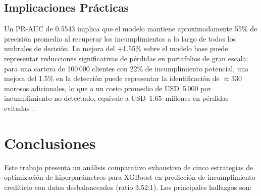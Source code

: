 \documentclass[journal]{IEEEtran}
\begin{document}
\subsection{Implicaciones Prácticas}
Un PR-AUC de 0.5543 implica que el modelo mantiene aproximadamente 55\% de precisión promedio al recuperar los incumplimientos a lo largo de todos los umbrales de decisión. La mejora del +1.55\% sobre el modelo base puede representar reducciones significativas de pérdidas en portafolios de gran escala: para una cartera de 100\,000 clientes con 22\% de incumplimiento potencial, una mejora del 1.5\% en la detección puede representar la identificación de ${\approx}$330 morosos adicionales, lo que a un costo promedio de USD~5\,000 por incumplimiento no detectado, equivale a USD~1.65~millones en pérdidas evitadas~\cite{thomas2000, hand1997}.

\section{Conclusiones}
\label{sec:conclusions}

Este trabajo presenta un análisis comparativo exhaustivo de cinco estrategias de optimización de hiperparámetros para XGBoost en predicción de incumplimiento crediticio con datos desbalanceados (ratio 3.52:1). Los principales hallazgos son:
\end{document}
